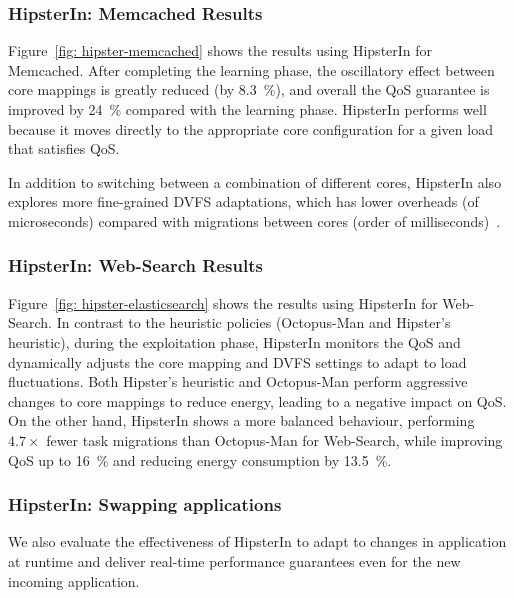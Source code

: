 \subsubsection{HipsterIn: Memcached Results}
\label{subsubsec: memcached results}

Figure~\ref{fig: hipster-memcached} shows the results using HipsterIn for Memcached.
After completing the learning phase, the oscillatory effect between core mappings is
greatly reduced (by \SI{8.3}{\percent}), and overall the QoS guarantee is improved by
\SI{24}{\percent} compared with the learning phase. HipsterIn performs well because it
moves directly to the appropriate core configuration for a given load that satisfies QoS. 

In addition to switching between a combination of different cores, HipsterIn also explores
more fine-grained DVFS adaptations, which has lower overheads (of microseconds) compared
with migrations between cores (order of milliseconds)~\citep{Kasture2015Rubik}.

\subsubsection{HipsterIn: Web-Search Results}
\label{subsubsec: web-search results}

Figure~\ref{fig: hipster-elasticsearch} shows the results using HipsterIn for Web-Search.
In contrast to the heuristic policies (Octopus-Man and Hipster's heuristic), during the
exploitation phase, HipsterIn monitors the QoS and dynamically adjusts the core mapping
and DVFS settings to adapt to load fluctuations. Both Hipster's heuristic and Octopus-Man
perform aggressive changes to core mappings to reduce energy, leading to a negative impact
on QoS. On the other hand, HipsterIn shows a more balanced behaviour, performing
$4.7\times$ fewer task migrations than Octopus-Man for Web-Search, while improving QoS up
to \SI{16}{\percent} and reducing energy consumption by \SI{13.5}{\percent}. 

\subsubsection{\textbf{HipsterIn: Swapping applications}}
\label{subsubsec: swap apps}


We also evaluate the effectiveness of HipsterIn to adapt to changes in application at
runtime and deliver real-time performance guarantees even for the new incoming
application.

